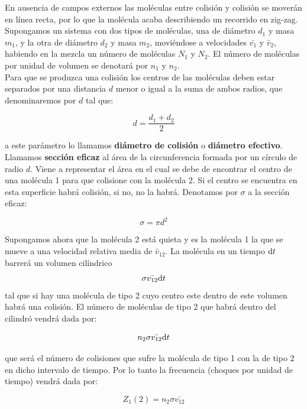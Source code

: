 \documentclass[12pt,a4paper,oneside]{book}
\begin{document}
En ausencia de campos externos las moléculas entre colisión y colisión se moverán en línea recta, por lo que la molécula acaba describiendo un recorrido en zig-zag. \\

Supongamos un sistema con dos tipos de moléculas, una de diámetro $d_1$ y masa $m_1$, y la otra de diámetro $d_2$ y masa $m_2$, moviéndose a velocidades $\bar{v_1}$ y $\bar{v}_2$, habiendo en la mezcla un número de moléculas $N_1$ y $N_2$. El número de moléculas por unidad de volumen se denotará por $n_1$ y $n_2$. \\

Para que se produzca una colisión los centros de las moléculas deben estar separados por una distancia $d$ menor o igual a la suma de ambos radios, que denominaremos por $d$ tal que:

\begin{equation}
d = \dfrac{d_1 + d_2}{2}
\end{equation}

a este parámetro lo llamamos \textbf{diámetro de colisión} o \textbf{diámetro efectivo}. Llamamos \textbf{sección eficaz} al área de la circunferencia formada por un círculo de radio $d$. Viene a representar el área en el cual se debe de encontrar el centro de una molécula 1 para que colisione con la molécula 2. Si el centro se encuentra en esta superficie habrá colisión, si no, no la habrá. Denotamos por $\sigma$ a la sección eficaz:

\begin{equation}
\sigma = \pi d^2
\end{equation}

Supongamos ahora que la molécula 2 está quieta y es la molécula 1 la que se mueve a una velocidad relativa media de $\bar{v}_12$. La molécula en un tiempo $\mathrm{d} t$ barrerá un volumen cilíndrico $$ \sigma \bar{v_{12}} \mathrm{d} t $$ tal que si hay una molécula de tipo 2 cuyo centro este dentro de este volumen habrá una colisión. El número de moléculas de tipo 2 que habrá dentro del cilindró vendrá dada por:

$$ n_2 \sigma \bar{v_{12}} \mathrm{d} t $$

que será el número de colisiones que sufre la molécula de tipo 1 con la de tipo 2 en dicho intervalo de tiempo. Por lo tanto la frecuencia (choques por unidad de tiempo) vendrá dada por:

\begin{equation}
Z_1 (2) = n_2 \sigma \bar{v_{12}}
\end{equation}
\end{document}

